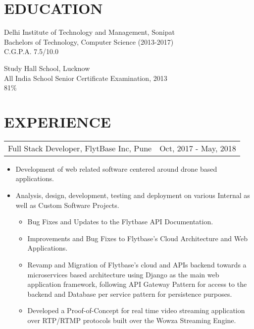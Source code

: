 \documentclass[margin]{res}
\begin{document}
  
\address { \href {mailto:divij.sehgaal7@gmail.com}{divij.sehgaal7@gmail.com} |  \href {http://www.linkedin.com/in/sehgaldivij/}{LinkedIn} | \href {http://www.github.com/SehgalDivij/} {Github}}
\begin{resume}

\section{EDUCATION}       
				Delhi Institute of Technology and Management, Sonipat \\
                Bachelors of Technology, Computer Science (2013-2017) \\
                C.G.P.A. 7.5/10.0

				Study Hall School, Lucknow \\
                All India School Senior Certificate Examination, 2013 \\
                81\%

\section{EXPERIENCE}      
                  \begin{tabular}{p{3.5in} r} %
                  Full Stack Developer, FlytBase Inc, Pune & Oct, 2017 - May, 2018
                  \end{tabular}	
                   \begin{itemize} %
                    \item[] Development of web related software centered around drone based applications.
                  	\item[] Analysis, design, development, testing and deployment on various Internal as well as Custom Software Projects.
                    \begin{itemize}
                      \item Bug Fixes and Updates to the Flytbase API Documentation.
                      \item Improvements and Bug Fixes to Flytbase's Cloud Architecture and Web Applications.
                      \item Revamp and Migration of Flytbase's cloud and APIs backend towards a microservices based architecture using Django as the main web application framework, following API Gateway Pattern for access to the backend and Database per service pattern for persistence purposes.
                      \item Developed a Proof-of-Concept for real time video streaming application over RTP/RTMP protocols built over the Wowza Streaming Engine.


\end{itemize}
\end{itemize}
\end{resume}
\end{document}
